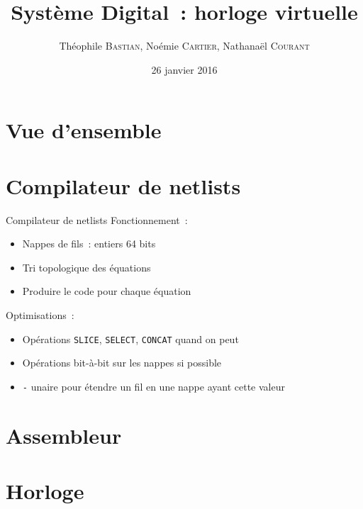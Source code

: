 \documentclass[11pt]{beamer}
\author{Théophile \textsc{Bastian}, Noémie \textsc{Cartier}, Nathanaël \textsc{Courant}}
\title{Système Digital~: horloge virtuelle}
\date{26 janvier 2016}
\begin{document}
\begin{frame}
\titlepage
\end{frame}


\section*{Vue d'ensemble}


\begin{frame}
\setcounter{tocdepth}{1} %
\tableofcontents
\end{frame}

\section{Compilateur de netlists}
\begin{frame}{Compilateur de netlists}
Fonctionnement~:
\begin{itemize}
\item{Nappes de fils~: entiers 64 bits}
\item{Tri topologique des équations}
\item{Produire le code pour chaque équation}
\end{itemize}

Optimisations~:
\begin{itemize}
\item{Opérations \verb!SLICE!, \verb!SELECT!, \verb!CONCAT! quand on
    peut}
\item{Opérations bit-à-bit sur les nappes si possible}
\item{\og{}\verb!-!\fg{} unaire pour étendre un fil en une nappe ayant cette
    valeur}
\end{itemize}
\end{frame}

\section{Assembleur}




\section{Horloge}
\end{document}
